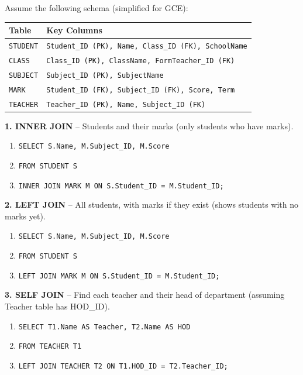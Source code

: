 \documentclass[11pt]{article}
\begin{document}
\begin{exemplebox}
Assume the following schema (simplified for GCE):
\begin{center}
\begin{tabularx}{\linewidth}{|l|X|}\hline
\textbf{Table} & \textbf{Key Columns} \\\hline
\texttt{STUDENT} & \texttt{Student\_ID (PK), Name, Class\_ID (FK), SchoolName} \\
\texttt{CLASS} & \texttt{Class\_ID (PK), ClassName, FormTeacher\_ID (FK)} \\
\texttt{SUBJECT} & \texttt{Subject\_ID (PK), SubjectName} \\
\texttt{MARK} & \texttt{Student\_ID (FK), Subject\_ID (FK), Score, Term} \\
\texttt{TEACHER} & \texttt{Teacher\_ID (PK), Name, Subject\_ID (FK)} \\\hline
\end{tabularx}
\end{center}

\textbf{1. INNER JOIN} -- Students and their marks (only students who have marks).
\begin{enumerate}
\item \texttt{SELECT S.Name, M.Subject\_ID, M.Score}
\item \texttt{FROM STUDENT S}
\item \texttt{INNER JOIN MARK M ON S.Student\_ID = M.Student\_ID;}
\end{enumerate}

\textbf{2. LEFT JOIN} -- All students, with marks if they exist (shows students with no marks yet).
\begin{enumerate}
\item \texttt{SELECT S.Name, M.Subject\_ID, M.Score}
\item \texttt{FROM STUDENT S}
\item \texttt{LEFT JOIN MARK M ON S.Student\_ID = M.Student\_ID;}
\end{enumerate}

\textbf{3. SELF JOIN} -- Find each teacher and their head of department (assuming Teacher table has HOD\_ID).
\begin{enumerate}
\item \texttt{SELECT T1.Name AS Teacher, T2.Name AS HOD}
\item \texttt{FROM TEACHER T1}
\item \texttt{LEFT JOIN TEACHER T2 ON T1.HOD\_ID = T2.Teacher\_ID;}
\end{enumerate}
\end{exemplebox}
\end{document}
